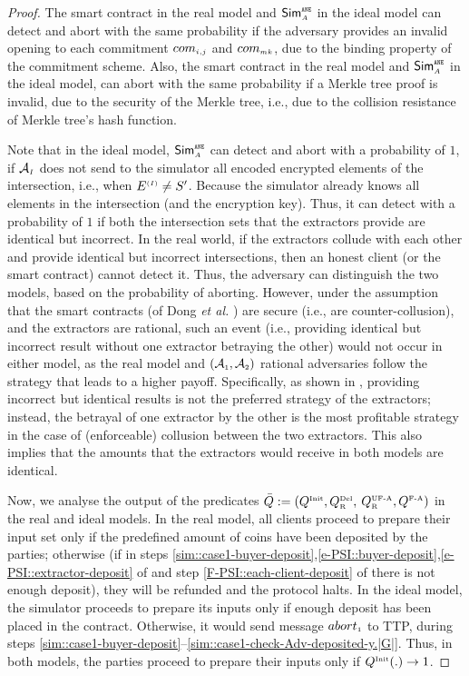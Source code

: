 \begin{proof}
The smart contract in the real model and $\mathsf{Sim}^{\scriptscriptstyle \mathtt{ANE}}_{\scriptscriptstyle A}$ in the ideal model can detect and abort with the same probability if the adversary provides an invalid opening to each commitment $com_{\scriptscriptstyle i,j}$ and $com_{\scriptscriptstyle {mk}}$, due to the binding property of the commitment scheme. Also, the smart contract in the real model and $\mathsf{Sim}^{\scriptscriptstyle \mathtt{ANE}}_{\scriptscriptstyle A}$ in the ideal model, can abort with the same probability if a Merkle tree proof is invalid, due to the security of the Merkle tree, i.e., due to the collision resistance of Merkle tree's hash function. 



Note that in the ideal model, $\mathsf{Sim}^{\scriptscriptstyle \mathtt{ANE}}_{\scriptscriptstyle A}$ can detect and abort with a probability of $1$, if $\mathcal{A}_{\scriptscriptstyle I}$ does not send to the simulator all encoded encrypted elements of the intersection,  i.e., when $E^{\scriptscriptstyle (I)}\neq S'$. Because the simulator already knows all elements in the intersection (and the encryption key). Thus, it can detect with a probability of $1$ if both the intersection sets that the extractors provide are identical but incorrect.   
%
 In the real world, if the extractors collude with each other and provide identical but incorrect intersections,   then an honest client (or the smart contract) cannot detect it. Thus, the adversary can distinguish the two models, based on the probability of aborting.  However, under the assumption that the smart contracts (of Dong \textit{et al.} \cite{dong2017betrayal}) are secure (i.e., are counter-collusion), and the extractors are rational, such an event (i.e., providing identical but incorrect result without one extractor betraying the other) would not occur in either model, as the real model and $(\mathcal{A}_{\scriptscriptstyle 1}, \mathcal{A}_{\scriptscriptstyle 2})$ rational adversaries follow the strategy that leads to a higher payoff. Specifically, as shown in \cite{dong2017betrayal}, providing incorrect but identical results is not the preferred strategy of the extractors; instead, the betrayal of one extractor by the other is the most profitable strategy in the case of (enforceable) collusion between the two extractors. This also implies that the amounts that the extractors would receive in both models are identical. 



Now, we analyse the output of the predicates $\bar Q:=(Q^{\scriptscriptstyle \text{Init}},  Q^{\scriptscriptstyle \text{Del}}_{\scriptscriptstyle\text{R}}, $ $Q^{\scriptscriptstyle \text{UF-A}}_{\scriptscriptstyle \text{R}}, Q^{\scriptscriptstyle \text{F-A}})$ in the real and ideal models. In the real model, all clients proceed to prepare their input set only if the predefined amount of coins have been deposited by the parties; otherwise (if in steps \ref{sim::case1-buyer-deposit},\ref{e-PSI::buyer-deposit},\ref{e-PSI::extractor-deposit} of \epsi and step \ref{F-PSI::each-client-deposit} of \fpsi there is not enough deposit), they will be refunded and the protocol halts. In the ideal model, the simulator proceeds to prepare its inputs only if enough deposit has been placed in the contract. Otherwise, it would send message $abort_{\scriptscriptstyle 1}$ to TTP, during steps \ref{sim::case1-buyer-deposit}--\ref{sim::case1-check-Adv-deposited-y.|G|}. Thus, in both models, the parties proceed to prepare their inputs only if $Q^{\scriptscriptstyle \text{Init}}(.) \rightarrow1$.  


\end{proof}
